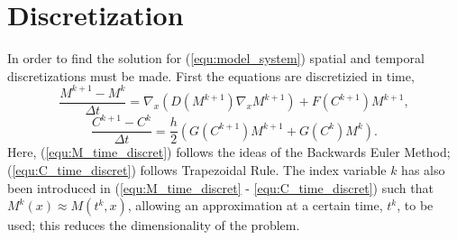 \section{Discretization}

In order to find the solution for (\ref{equ:model_system}) spatial and temporal discretizations must be made.
First the equations are discretizied in time, 
\begin{equation} \label{equ:M_time_discret}
  \frac{M^{k+1} - M^{k}}{\Delta t} = \nabla_x (D(M^{k+1}) \nabla_x M^{k+1}) + F(C^{k+1}) M^{k+1},
\end{equation}
\begin{equation} \label{equ:C_time_discret}
  \frac{C^{k+1} - C^{k}}{\Delta t} = \frac{h}{2} ( G(C^{k+1}) M^{k+1} + G(C^{k}) M^{k} ).
\end{equation}
Here, (\ref{equ:M_time_discret}) follows the ideas of the Backwards Euler Method; (\ref{equ:C_time_discret}) follows Trapezoidal Rule. 
The index variable $k$ has also been introduced in (\ref{equ:M_time_discret} - \ref{equ:C_time_discret}) such that $M^{k}(x) \approx M(t^{k}, x)$, allowing an approximation at a certain time, $t^{k}$, to be used; this reduces the dimensionality of the problem. 

